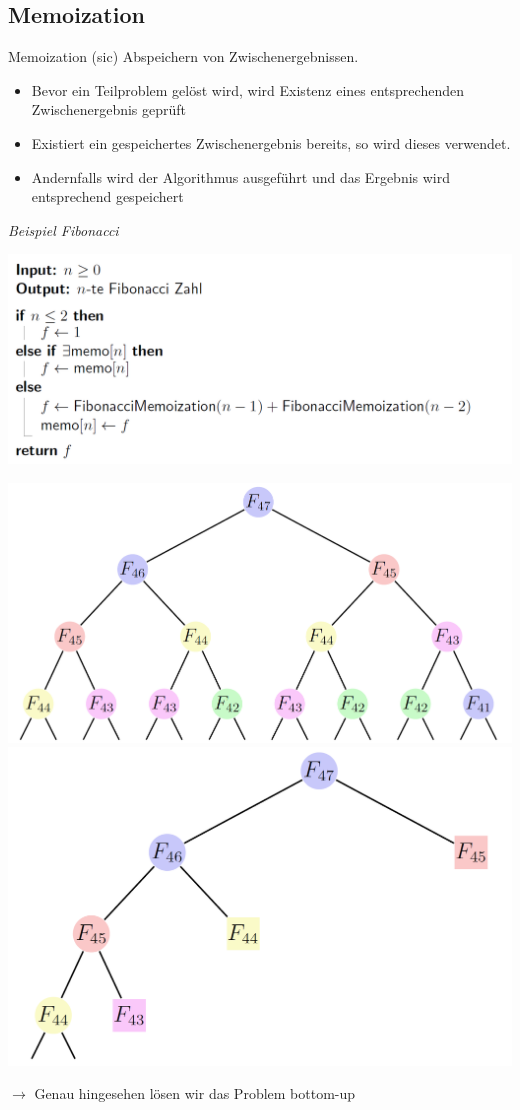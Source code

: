 \begin{sectionbox}
\subsection{Memoization}\smallskip
Memoization (sic) Abspeichern von Zwischenergebnissen.
\begin{itemize}
    \item Bevor ein Teilproblem gelöst wird, wird Existenz eines entsprechenden Zwischenergebnis geprüft
    \item Existiert ein gespeichertes Zwischenergebnis bereits, so wird dieses verwendet.
    \item Andernfalls wird der Algorithmus ausgeführt und das Ergebnis wird entsprechend gespeichert
\end{itemize}\smallskip

\textit{Beispiel Fibonacci}\par
\begin{center}
    \includegraphics[width = \columnwidth]{../img/memo.png}\par\smallskip
    \includegraphics[width = 0.54\columnwidth]{../img/Memo_Fib_schema_vor.png}
    \includegraphics[width = 0.45\columnwidth]{../img/Memo_Fib_schema.png}
\end{center}
$\rightarrow$ Genau hingesehen lösen wir das Problem bottom-up

\end{sectionbox}
